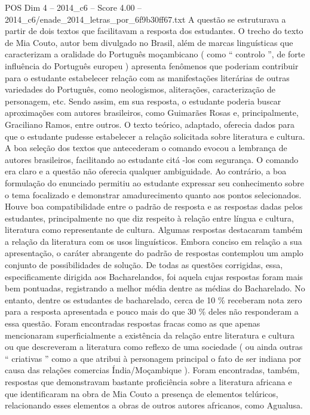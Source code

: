 \begin{textsample}{POS Dim 4 – 2014\_c6 – Score 4.00 – 2014\_c6/enade\_2014\_letras\_por\_6f9b30ff67.txt}
A questão se estruturava a partir de dois textos que facilitavam a resposta dos estudantes.
O trecho do texto de Mia Couto, autor bem divulgado no Brasil, além de marcas linguísticas que caracterizam a oralidade do Português moçambicano ( como “ controlo ”, de forte influência do Português europeu ) apresenta fenômenos que poderiam contribuir para o estudante estabelecer relação com as manifestações literárias de outras variedades do Português, como neologismos, aliterações, caracterização de personagem, etc.
Sendo assim, em sua resposta, o estudante poderia buscar aproximações com autores brasileiros, como Guimarães Rosas e, principalmente, Graciliano Ramos, entre outros.
O texto teórico, adaptado, oferecia dados para que o estudante pudesse estabelecer a relação solicitada sobre literatura e cultura.
A boa seleção dos textos que antecederam o comando evocou a lembrança de autores brasileiros, facilitando ao estudante citá -los com segurança.
O comando era claro e a questão não oferecia qualquer ambiguidade.
Ao contrário, a boa formulação do enunciado permitiu ao estudante expressar seu conhecimento sobre o tema focalizado e demonstrar amadurecimento quanto aos pontos selecionados.
Houve boa compatibilidade entre o padrão de resposta e as respostas dadas pelos estudantes, principalmente no que diz respeito à relação entre língua e cultura, literatura como representante de cultura.
Algumas respostas destacaram também a relação da literatura com os usos linguísticos.
Embora conciso em relação a sua apresentação, o caráter abrangente do padrão de respostas contemplou um amplo conjunto de possibilidades de solução.
De todas as questões corrigidas, essa, especificamente dirigida aos Bacharelandos, foi aquela cujas respostas foram mais bem pontuadas, registrando a melhor média dentre as médias do Bacharelado.
No entanto, dentre os estudantes de bacharelado, cerca de 10 \% receberam nota zero para a resposta apresentada e pouco mais do que 30 \% deles não responderam a essa questão.
Foram encontradas respostas fracas como as que apenas mencionaram superficialmente a existência da relação entre literatura e cultura ou que descreveram a literatura como reflexo de uma sociedade ( ou ainda outras “ criativas ” como a que atribui à personagem principal o fato de ser indiana por causa das relações comercias Índia/Moçambique ).
Foram encontradas, também, respostas que demonstravam bastante proficiência sobre a literatura africana e que identificaram na obra de Mia Couto a presença de elementos telúricos, relacionando esses elementos a obras de outros autores africanos, como Agualusa.

\end{textsample}
